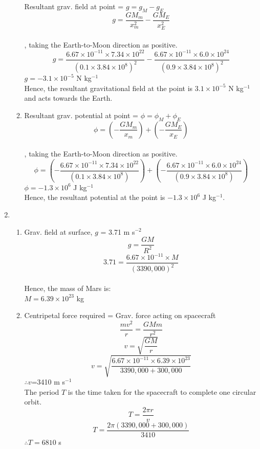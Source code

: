 \documentclass[a4paper,12pt]{article}
\begin{document}
\begin{enumerate}
\begin{enumerate}
Resultant grav. field at point = $g = g_M - g_E$ \\
\[ g = \frac{GM_m}{x_m^2} -  \frac{GM_E}{x_E^2}\] \\
, taking the Earth-to-Moon direction as positive.\\
\[ g = \frac{6.67\times 10^{-11}\times  7.34 \times 10^{22}}{(0.1 \times 3.84 \times 10^8)^2} -  \frac{6.67\times 10^{-11}\times 6.0 \times 10^{24}} {(0.9 \times 3.84 \times 10^8)^2}\]
$g = -3.1 \times 10^{-5}$ N kg$^{-1}$\\
Hence, the resultant gravitational field at the point is $3.1 \times 10^{-5}$ N kg$^{-1}$ and acts towards the Earth.

\item 
Resultant grav. potential at point = $\phi = \phi_M + \phi_E$ \\
\[ \phi = \left( -\frac{GM_m}{x_m} \right) + \left(-\frac{GM_E}{x_E} \right) \] \\
, taking the Earth-to-Moon direction as positive.\\
\[ \phi = \left( -\frac{6.67\times 10^{-11}\times  7.34 \times 10^{22}}{(0.1 \times 3.84 \times 10^8)} \right) + \left(-\frac{6.67\times 10^{-11}\times 6.0 \times 10^{24}} {(0.9 \times 3.84 \times 10^8)} \right) \]
$\phi = -1.3 \times 10^6$ J kg$^{-1}$\\
Hence, the resultant potential at the point is $-1.3 \times 10^6$ J kg$^{-1}$.

\end{enumerate}

\newpage %

\item 
\begin{enumerate}
\item Grav. field at surface, $g$ = 3.71 m s$^{-2}$
\[ g = \frac{GM}{R^2} \] 
\[ 3.71 = \frac{6.67 \times 10^{-11} \times M}{(3390,000)^2} \] \\
Hence, the mass of Mars is:\\
$M = 6.39 \times 10^{23}$ kg \\

\item Centripetal force required = Grav. force acting on spacecraft \\
\[ \frac{mv^2}{r}=\frac{GMm}{r^2}    \]
\[v = \sqrt{\frac{GM}{r}}    \]
\[v = \sqrt{\frac{6.67 \times 10^{-11} \times 6.39 \times 10^{23}}{3390,000+300,000}}    \]
\vspace{5pt}
$\therefore v$=3410 m s$^{-1}$ \\
The period $T$ is the time taken for the spacecraft to complete one circular orbit.\\
\[ T =\frac{2\pi r}{v}   \]
\[ T =\frac{2\pi (3390,000+300,000)}{3410}   \]
$\therefore T = 6810$ s\\


\end{enumerate}
\end{enumerate}
\end{document}
